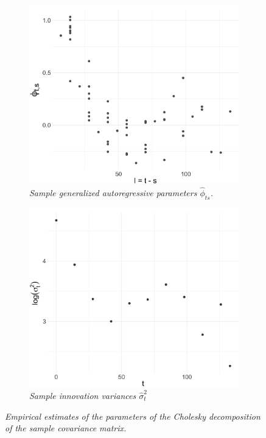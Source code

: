 \begin{figure}[H]
 \begin{subfigure}[t]{.65\textwidth}
  \centering
\includegraphics[width = \textwidth]{img/cattle/cattleA-regressogram}
 \caption{\textit{Sample generalized autoregressive parameters $\hat{\phi}_{ts}$.}}
\label{fig:cattleA-regressogram}
 \end{subfigure}
   \centering
    \begin{subfigure}[t]{.65\textwidth}
    \includegraphics[width=\textwidth]{img/cattle/cattleA-innovation-variogram}
 \caption{\textit{Sample innovation variances $\hat{\sigma}_t^2$}} \label{fig:cattleA-innovation-variogram}
 \end{subfigure}
 \caption{\textit{Empirical estimates of the parameters of the Cholesky decomposition of the sample covariance matrix.}} \label{fig:cattleA-innovation-variogram-and-regressogram}
\end{figure}

